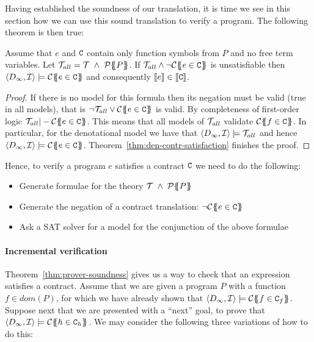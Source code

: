 Having established the soundness of our translation, it is time 
we see in this section how we can use this sound translation to verify a program. 
The following theorem is then true:

\begin{theorem}[Soundness]\label{thm:prover-soundness}
Assume that $e$ and $\Ct$ contain only function symbols from $P$ and no free term variables.
Let $\Th_{all} = \Th\;\land\;\ptrans{}{P}$. 
If $\Th_{all} \land \neg\ctrans{\Sigma}{P}{e \in \Ct}$ is unsatisfiable 
then $\langle D_\infty,{\cal I}\rangle \models \ctrans{\Sigma}{P}{e \in \Ct}$ and 
consequently $\dbrace{e} \in \dbrace{\Ct}$.
\end{theorem}
\begin{proof}
If there is no model for this formula then its negation must be valid (true in all models), that 
is $ \neg \Th_{all} \lor \ctrans{\Sigma}{P}{e \in \Ct}$ is valid. By completeness
of first-order logic $\Th_{all} |- \ctrans{\Sigma}{P}{e \in \Ct}$. This means 
that all models of $\Th_{all}$ validate $\ctrans{\Sigma}{P}{f \in \Ct}$. In particular, 
for the denotational model we have that $\langle D_\infty,{\cal I}\rangle \models \Th_{all}$ 
and hence $\langle D_\infty,{\cal I} \rangle \models \ctrans{\Sigma}{P}{e \in \Ct}$. 
Theorem~\ref{thm:den-contr-satisfaction} finishes the proof.
\end{proof}

Hence, to verify a program $e$ satisfies a contract $\Ct$ we need to do the following:
\begin{itemize}
  \item Generate formulae for the theory $\Th\;\land\;\ptrans{}{P}$
  \item Generate the negation of a contract translation: $\neg\ctrans{\Sigma}{P}{e \in \Ct}$
  \item Ask a SAT solver for a model for the conjunction of the above formulae
\end{itemize}

\paragraph{Incremental verification}

Theorem~\ref{thm:prover-soundness} gives us a way to check that an expression satisfies a 
contract. Assume that we are given a program $P$ with a function $f \in dom(P)$, for which 
we have already shown that $\langle D_\infty,{\cal I}\rangle \models \ctrans{\Sigma}{P}{f \in \Ct_f}$.
Suppose next that we are presented with a ``next'' goal, to prove that 
$\langle D_\infty,{\cal I}\rangle \models \ctrans{\Sigma}{P}{h \in \Ct_h}$. 
We may consider the following three variations of how to do this:

